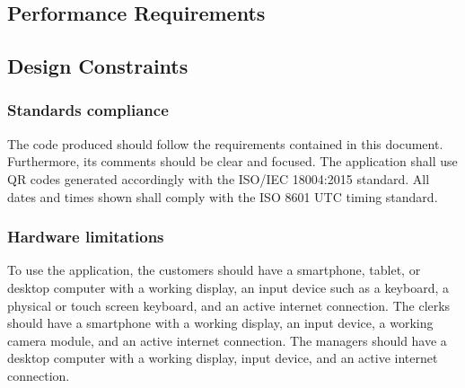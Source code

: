 \subsection{Performance Requirements}


\subsection{Design Constraints}

\subsubsection{Standards compliance}


The code produced should follow the requirements contained in this document.
Furthermore, its comments should be clear and focused.
The application shall use QR codes generated accordingly with the ISO/IEC 18004:2015 standard.
All dates and times shown shall comply with the ISO 8601 UTC timing standard.

\subsubsection{Hardware limitations}

To use the application, the customers should have a smartphone, tablet, or desktop computer with a working display, an input device such as a keyboard, a physical or touch screen keyboard, and an active internet connection.
The clerks should have a smartphone with a working display, an input device, a working camera module, and an active internet connection.
The managers should have a desktop computer with a working display, input device, and an active internet connection.


